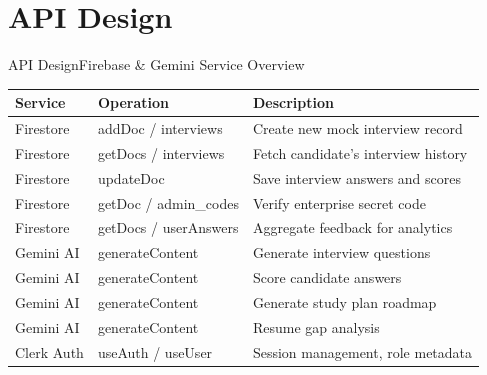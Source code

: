 \documentclass{beamer}
\begin{document}
\section{API Design}
\begin{frame}{API Design}{Firebase \& Gemini Service Overview}
\scriptsize
\begin{table}
\centering
\begin{tabular}{|l|l|p{4.5cm}|}
\hline
\textbf{Service} & \textbf{Operation} & \textbf{Description} \\ \hline
Firestore & addDoc / interviews & Create new mock interview record \\ \hline
Firestore & getDocs / interviews & Fetch candidate's interview history \\ \hline
Firestore & updateDoc & Save interview answers and scores \\ \hline
Firestore & getDoc / admin\_codes & Verify enterprise secret code \\ \hline
Firestore & getDocs / userAnswers & Aggregate feedback for analytics \\ \hline
Gemini AI & generateContent & Generate interview questions \\ \hline
Gemini AI & generateContent & Score candidate answers \\ \hline
Gemini AI & generateContent & Generate study plan roadmap \\ \hline
Gemini AI & generateContent & Resume gap analysis \\ \hline
Clerk Auth & useAuth / useUser & Session management, role metadata \\ \hline
\end{tabular}
\end{table}
\end{frame}
\end{document}
